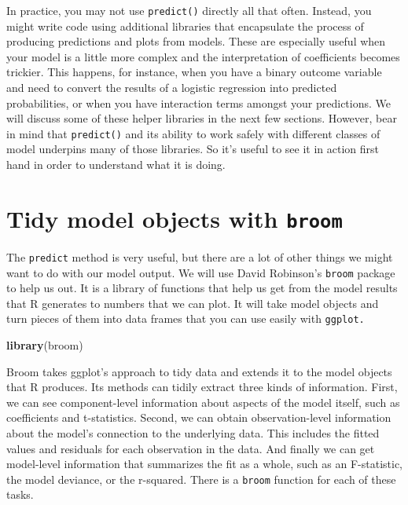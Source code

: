 \documentclass[]{book}
\newenvironment{Shaded}{\begin{snugshade}}{\end{snugshade}}
\newcommand{\KeywordTok}[1]{\textcolor[rgb]{0.13,0.29,0.53}{\textbf{#1}}}
\newcommand{\NormalTok}[1]{#1}
\begin{document}
In practice, you may not use \texttt{predict()} directly all that often. Instead, you might write code using additional libraries that encapsulate the process of producing predictions and plots from models. These are especially useful when your model is a little more complex and the interpretation of coefficients becomes trickier. This happens, for instance, when you have a binary outcome variable and need to convert the results of a logistic regression into predicted probabilities, or when you have interaction terms amongst your predictions. We will discuss some of these helper libraries in the next few sections. However, bear in mind that \texttt{predict()} and its ability to work safely with different classes of model underpins many of those libraries. So it's useful to see it in action first hand in order to understand what it is doing.

\hypertarget{tidy-model-objects-with-broom}{%
\section{\texorpdfstring{Tidy model objects with \texttt{broom}}{Tidy model objects with broom}}\label{tidy-model-objects-with-broom}}

The \texttt{predict} method is very useful, but there are a lot of other things we might want to do with our model output. We will use David Robinson's \texttt{broom} package to help us out. It is a library of functions that help us get from the model results that R generates to numbers that we can plot. It will take model objects and turn pieces of them into data frames that you can use easily with \texttt{ggplot.}

\begin{Shaded}
\begin{Highlighting}[]
\KeywordTok{library}\NormalTok{(broom)}
\end{Highlighting}
\end{Shaded}

Broom takes ggplot's approach to tidy data and extends it to the model objects that R produces. Its methods can tidily extract three kinds of information. First, we can see component-level information about aspects of the model itself, such as coefficients and t-statistics. Second, we can obtain observation-level information about the model's connection to the underlying data. This includes the fitted values and residuals for each observation in the data. And finally we can get model-level information that summarizes the fit as a whole, such as an F-statistic, the model deviance, or the r-squared. There is a \texttt{broom} function for each of these tasks.
\end{document}

